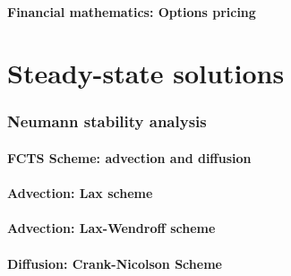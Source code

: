 \documentclass[15pt]{article}
\begin{document}
    \subsection{Financial mathematics: Options pricing}


\part{Steady-state solutions}



\appendix

\section{\label{app:neumann}Neumann stability analysis}

\subsection{FCTS Scheme: advection and diffusion}

\subsection{Advection: Lax scheme}

\subsection{Advection: Lax-Wendroff scheme}

\subsection{Diffusion: Crank-Nicolson Scheme}
\end{document}
